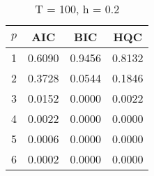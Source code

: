 \begin{table}[ht]
\captionsetup{justification=raggedright,singlelinecheck=false}
\caption*{T = 100, h = 0.2}
\begin{tabular}{c|ccc}
  $p$ & AIC & BIC & HQC \\\hline
  1 & 0.6090 & 0.9456 & 0.8132 \\
  2 & 0.3728 & 0.0544 & 0.1846 \\
  3 & 0.0152 & 0.0000 & 0.0022 \\
  4 & 0.0022 & 0.0000 & 0.0000 \\
  5 & 0.0006 & 0.0000 & 0.0000 \\
  6 & 0.0002 & 0.0000 & 0.0000 \\
\end{tabular}
\end{table}
